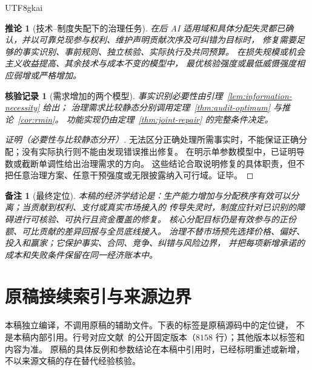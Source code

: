 \documentclass[12pt,a4paper,openany]{report}
\newtheorem{corollary}{推论}[chapter]
\newtheorem{remark}{备注}[chapter]
\newtheorem{Certificate}{核验记录}[chapter]
\newcommand{\Original}{原稿}
\begin{document}
\begin{CJK*}{UTF8}{gkai}
\begin{corollary}[技术--制度失配下的治理任务]
\label{cor:conclusion}
在后 AI 适用域和具体分配失灵都已确认，并以可靠兑现参与权利、维护声明贡献次序及可纠错为目标时，
修复需要足够的事实识别、事前规则、独立核验、实际执行及共同预算。
在损失规模或机会主义收益提高、其余技术与成本不变的模型中，
最优核验强度或最低威慑强度相应弱增或严格增加。
\end{corollary}
\begin{Certificate}[需求增加的两个模型]
事实识别必要性由引理~\ref{lem:information-necessity} 给出；
治理需求比较静态分别调用定理~\ref{thm:audit-optimum} 与推论~\ref{cor:rmin}。
功能实现仍由定理~\ref{thm:joint-repair} 的完整条件决定。
\end{Certificate}
\begin{proof}[证明（必要性与比较静态分开）]
无法区分正确处理所需事实时，不能保证正确分配；没有实际执行则不能由发现错误推出修复。
在明示单参数模型中，已证明导数或截断单调性给出治理需求的方向。
这些结论合取说明修复的具体职责，但不把任意治理方案、任意干预强度或无限披露纳入可行域。证毕。
\end{proof}

\begin{remark}[最终定位]
本稿的经济学结论是：生产能力增加与分配秩序有效可以分离；当贡献到权利、支付或真实市场接入的
传导失灵时，制度应针对已识别的障碍进行可核验、可执行且资金覆盖的修复。
核心分配目标仍是有效参与的正份额、可比贡献的差异回报与全员底线接入。
治理不替市场预先选择价格、偏好、投入和赢家；它保护事实、合同、竞争、纠错与风险边界，
并把每项新增承诺的成本和失败条件保留在同一经济账本中。
\end{remark}

\appendix
\chapter{原稿接续索引与来源边界}
\label{app:source}

本稿独立编译，不调用\Original 的辅助文件。下表的标签是\Original 源码中的定位键，
不是本稿内部引用。行号对应文献~\cite{SourceMarket}的公开固定版本（$8158$ 行）；其他版本以标签和内容为准。
原稿的具体反例和参数结论在本稿中引用时，已经标明重述或新增，不以来源文稿的存在替代经验核验。


\end{CJK*}
\end{document}
